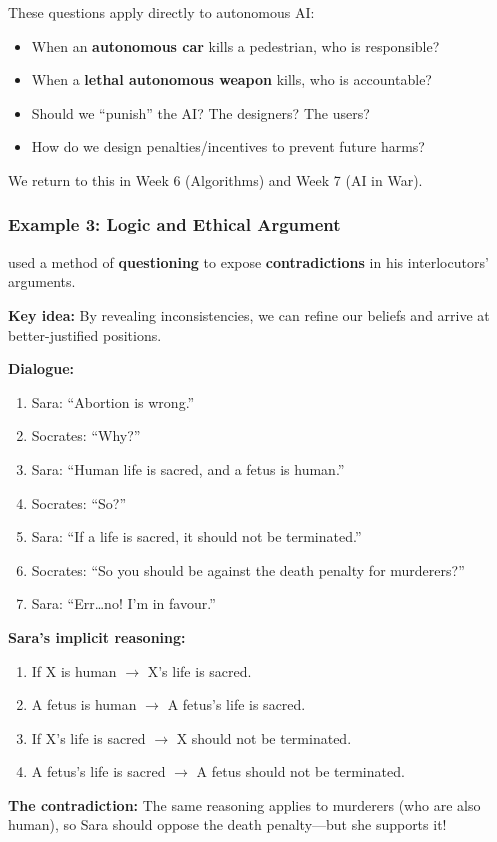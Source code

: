 \begin{tipbox}[Relevance to AI]
These questions apply directly to autonomous AI:
\begin{itemize}
  \item When an \textbf{autonomous car} kills a pedestrian, who is responsible?
  \item When a \textbf{lethal autonomous weapon} kills, who is accountable?
  \item Should we ``punish'' the AI? The designers? The users?
  \item How do we design penalties/incentives to prevent future harms?
\end{itemize}
We return to this in Week 6 (Algorithms) and Week 7 (AI in War).
\end{tipbox}

\bigseparator

\subsubsection{Example 3: Logic and Ethical Argument}

\begin{defbox}
 used a method of \textbf{questioning} to expose \textbf{contradictions} in his interlocutors' arguments.

\textbf{Key idea:} By revealing inconsistencies, we can refine our beliefs and arrive at better-justified positions.
\end{defbox}

\begin{exbox}
\textbf{Dialogue:}
\begin{enumerate}
  \item Sara: ``Abortion is wrong.''
  \item Socrates: ``Why?''
  \item Sara: ``Human life is sacred, and a fetus is human.''
  \item Socrates: ``So?''
  \item Sara: ``If a life is sacred, it should not be terminated.''
  \item Socrates: ``So you should be against the death penalty for murderers?''
  \item Sara: ``Err\ldots no! I'm in favour.''
\end{enumerate}

\textbf{Sara's implicit reasoning:}
\begin{enumerate}
  \item If X is human $\to$ X's life is sacred.
  \item A fetus is human $\to$ A fetus's life is sacred.
  \item If X's life is sacred $\to$ X should not be terminated.
  \item A fetus's life is sacred $\to$ A fetus should not be terminated.
\end{enumerate}

\textbf{The contradiction:} The same reasoning applies to murderers (who are also human), so Sara should oppose the death penalty---but she supports it!
\end{exbox}

